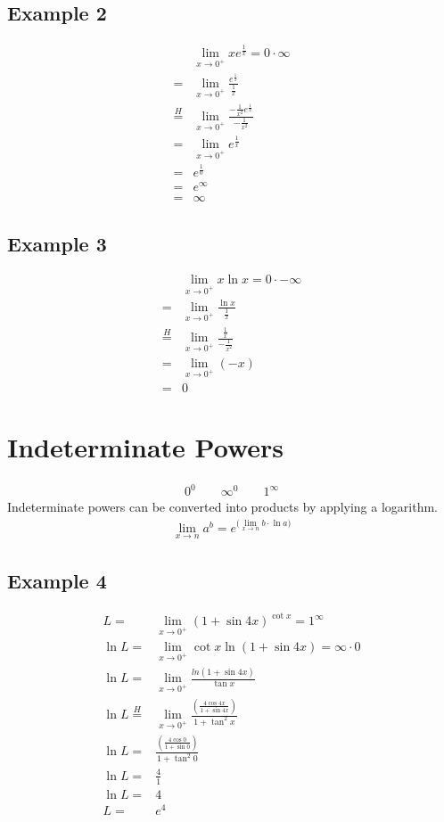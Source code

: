\documentclass{article}
\theoremstyle{mytheoremstyle}
\theoremstyle{mytheoremstyle}
\theoremstyle{myproblemstyle}
\newcommand\lH{\stackrel{H}{=}}
\begin{document}
    \subsection*{Example 2}
    \begin{align*}
        & \lim_{x\to 0^+} xe^{\frac{1}{x}} = 0\cdot\infty \\
        =& \lim_{x\to 0^+} \frac{e^{\frac{1}{x}}}{\frac{1}{x}} \\
        \lH& \lim_{x\to 0^+} \frac{-\frac{1}{x^2} e^{\frac{1}{x}}}{-\frac{1}{x^2}} \\
        =& \lim_{x\to 0^+} e^{\frac{1}{x}} \\
        =& e^{\frac{1}{0}} \\
        =& e^{\infty} \\
        =& \infty
    \end{align*}

    \subsection*{Example 3}
    \begin{align*}
        & \lim_{x\to 0^+} x\ln x = 0\cdot-\infty \\
        =& \lim_{x\to 0^+} \frac{\ln x}{\frac{1}{x}}\\
        \lH& \lim_{x\to 0^+} \frac{\frac{1}{x}}{-\frac{1}{x^2}} \\
        =& \lim_{x\to 0^+} (-x) \\
        =& 0
    \end{align*}

    \section*{Indeterminate Powers}
    \begin{align*}
        0^0 \qquad
        \infty^0 \qquad
        1^\infty
    \end{align*}
    Indeterminate powers can be converted into products by applying a logarithm.
    \begin{align*}
        \lim_{x\to n} a^b = e^{\big(\lim\limits_{x\to n} b\cdot \ln a\big)}
    \end{align*}

    \subsection*{Example 4}
    \begin{align*}
        L =& \lim_{x\to 0^+} (1+\sin 4x)^{\cot x} = 1^\infty \\
        \ln L =& \lim_{x\to 0^+} \cot x \ln(1+\sin 4x) = \infty \cdot 0 \\
        \ln L =& \lim_{x\to 0^+} \frac{ln(1+\sin 4x)}{\tan x} \\
        \ln L \lH& \lim_{x\to 0^+} \frac{(\frac{4\cos 4x}{1+\sin 4x})}{1+\tan^2 x} \\
        \ln L =& \frac{(\frac{4\cos 0}{1+\sin 0})}{1+\tan^2 0} \\
        \ln L =& \frac{4}{1} \\
        \ln L =& 4 \\
        L   =& e^4
    \end{align*}
\end{document}
